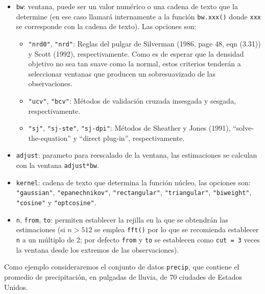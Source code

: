\documentclass[
  spanish,
  10pt,
]{book}
\theoremstyle{break}
\theoremstyle{nonumberplain}
\begin{document}
\begin{itemize}
\item
  \texttt{bw}: ventana, puede ser un valor numérico o una cadena de texto que la determine
  (en ese caso llamará internamente a la función \texttt{bw.xxx()} donde \texttt{xxx} se corresponde
  con la cadena de texto). Las opciones son:

  \begin{itemize}
  \item
    \texttt{"nrd0"}, \texttt{"nrd"}: Reglas del pulgar de Silverman (1986, page 48, eqn (3.31)) y
    Scott (1992), respectivamente. Como es de esperar que la densidad objetivo
    no sea tan suave como la normal, estos criterios tenderán a seleccionar
    ventanas que producen un sobresuavizado de las observaciones.
  \item
    \texttt{"ucv"}, \texttt{"bcv"}: Métodos de validación cruzada insesgada y sesgada, respectivamente.
  \item
    \texttt{"sj"}, \texttt{"sj-ste"}, \texttt{"sj-dpi"}: Métodos de Sheather y Jones (1991),
    ``solve-the-equation'' y ``direct plug-in'', respectivamente.
  \end{itemize}
\item
  \texttt{adjust}: parameto para reescalado de la ventana, las estimaciones se calculan
  con la ventana \texttt{adjust*bw}.
\item
  \texttt{kernel}: cadena de texto que determina la función núcleo, las opciones son: \texttt{"gaussian"},
  \texttt{"epanechnikov"}, \texttt{"rectangular"}, \texttt{"triangular"}, \texttt{"biweight"}, \texttt{"cosine"} y \texttt{"optcosine"}.
\item
  \texttt{n}, \texttt{from}, \texttt{to}: permiten establecer la rejilla en la que se obtendrán las estimaciones
  (si \(n>512\) se emplea \texttt{fft()} por lo que se recomienda establecer \texttt{n} a un múltiplo de 2;
  por defecto \texttt{from} y \texttt{to} se establecen como \texttt{cut\ =\ 3} veces la ventana desde los extremos
  de las observaciones).
\end{itemize}

Como ejemplo consideraremos el conjunto de datos \texttt{precip}, que contiene el promedio de precipitación,
en pulgadas de lluvia, de 70 ciudades de Estados Unidos.
\end{document}
